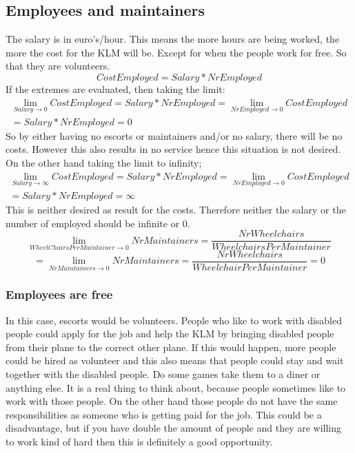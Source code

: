 \documentclass[a4paper, 11pt, notitlepage]{report}
\begin{document}
\subsection{Employees and maintainers}
The salary is in euro's/hour. This means the more hours are being worked, the more the cost for the KLM will be. Except for when the people work for free. So that they are volunteers.\\
\begin{equation}
CostEmployed = Salary * NrEmployed
\end{equation}
If the extremes are evaluated, then taking the limit:
\begin{multline}
\lim_{Salary \rightarrow 0}CostEmployed = Salary * NrEmployed = \lim_{NrEmployed \rightarrow 0}CostEmployed \\ = Salary * NrEmployed = 0
\end{multline}
So by either having no escorts or maintainers and/or no salary, there will be no costs. However this also results in no service hence this situation is not desired. On the other hand taking the limit to infinity;
\begin{multline}
\lim_{Salary \rightarrow \infty} CostEmployed = Salary * NrEmployed = \lim_{NrEmployed \rightarrow 0} CostEmployed \\ = Salary * NrEmployed = \infty
\end{multline}
This is neither desired as result for the costs. Therefore neither the salary or the number of employed should be infinite or 0.
\begin{equation}
\lim_{WheelChairsPerMaintainer \rightarrow 0} NrMaintainers = \frac{NrWheelchairs}{WheelchairsPerMaintainer}
\end{equation}
\begin{equation}
= \lim_{NrMaintainers \rightarrow 0}NrMaintainers = \frac{NrWheelchairs}{WheelchairPerMaintainer} = 0
\end{equation}


\subsubsection{Employees are free}
In this case, escorts would be volunteers. People who like to work with disabled people could apply for the job and help the KLM by bringing disabled people from their plane to the correct other plane. If this would happen, more people could be hired as volunteer and this also means that people could stay and wait together with the disabled people. Do some games take them to a diner or anything else. It is a real thing to think about, because people sometimes like to work with those people. On the other hand those people do not have the same responsibilities as someone who is getting paid for the job. This could be a disadvantage, but if you have double the amount of people and they are willing to work kind of hard then this is definitely a good opportunity.
\end{document}
